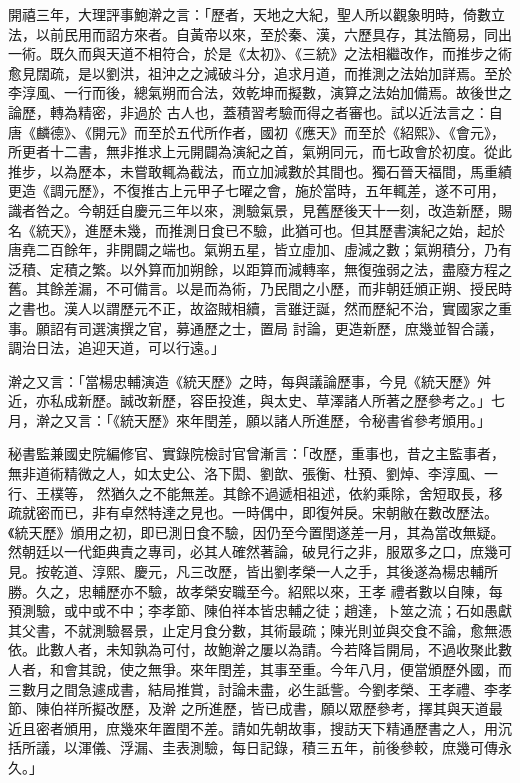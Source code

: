 \begin{pinyinscope}
 開禧三年，大理評事鮑澣之言：「歷者，天地之大紀，聖人所以觀象明時，倚數立法，以前民用而詔方來者。自黃帝以來，至於秦、漢，六歷具存，其法簡易，同出一術。既久而與天道不相符合，於是《太初》、《三統》之法相繼改作，而推步之術愈見闊疏，是以劉洪，祖沖之之減破斗分，追求月道，而推測之法始加詳焉。至於李淳風、一行而後，總氣朔而合法，效乾坤而擬數，演算之法始加備焉。故後世之論歷，轉為精密，非過於
 古人也，蓋積習考驗而得之者審也。試以近法言之：自唐《麟德》、《開元》而至於五代所作者，國初《應天》而至於《紹熙》、《會元》，所更者十二書，無非推求上元開闢為演紀之首，氣朔同元，而七政會於初度。從此推步，以為歷本，未嘗敢輒為截法，而立加減數於其間也。獨石晉天福間，馬重績更造《調元歷》，不復推古上元甲子七曜之會，施於當時，五年輒差，遂不可用，識者咎之。今朝廷自慶元三年以來，測驗氣景，見舊歷後天十一刻，改造新歷，賜
 名《統天》，進歷未幾，而推測日食已不驗，此猶可也。但其歷書演紀之始，起於唐堯二百餘年，非開闢之端也。氣朔五星，皆立虛加、虛減之數；氣朔積分，乃有泛積、定積之繁。以外算而加朔餘，以距算而減轉率，無復強弱之法，盡廢方程之舊。其餘差漏，不可備言。以是而為術，乃民間之小歷，而非朝廷頒正朔、授民時之書也。漢人以謂歷元不正，故盜賊相續，言雖迂誕，然而歷紀不治，實國家之重事。願詔有司選演撰之官，募通歷之士，置局
 討論，更造新歷，庶幾並智合議，調治日法，追迎天道，可以行遠。」



 澣之又言：「當楊忠輔演造《統天歷》之時，每與議論歷事，今見《統天歷》舛近，亦私成新歷。誠改新歷，容臣投進，與太史、草澤諸人所著之歷參考之。」七月，澣之又言：「《統天歷》來年閏差，願以諸人所進歷，令秘書省參考頒用。」



 秘書監兼國史院編修官、實錄院檢討官曾漸言：「改歷，重事也，昔之主監事者，無非道術精微之人，如太史公、洛下閎、劉歆、張衡、杜預、劉焯、李淳風、一行、王樸等，
 然猶久之不能無差。其餘不過遞相祖述，依約乘除，舍短取長，移疏就密而已，非有卓然特達之見也。一時偶中，即復舛戾。宋朝敝在數改歷法。《統天歷》頒用之初，即已測日食不驗，因仍至今置閏遂差一月，其為當改無疑。然朝廷以一代鉅典責之專司，必其人確然著論，破見行之非，服眾多之口，庶幾可見。按乾道、淳熙、慶元，凡三改歷，皆出劉孝榮一人之手，其後遂為楊忠輔所勝。久之，忠輔歷亦不驗，故孝榮安職至今。紹熙以來，王孝
 禮者數以自陳，每預測驗，或中或不中；李孝節、陳伯祥本皆忠輔之徒；趙達，卜筮之流；石如愚獻其父書，不就測驗晷景，止定月食分數，其術最疏；陳光則並與交食不論，愈無憑依。此數人者，未知孰為可付，故鮑澣之屢以為請。今若降旨開局，不過收聚此數人者，和會其說，使之無爭。來年閏差，其事至重。今年八月，便當頒歷外國，而三數月之間急遽成書，結局推賞，討論未盡，必生詆訾。今劉孝榮、王孝禮、李孝節、陳伯祥所擬改歷，及澣
 之所進歷，皆已成書，願以眾歷參考，擇其與天道最近且密者頒用，庶幾來年置閏不差。請如先朝故事，搜訪天下精通歷書之人，用沉括所議，以渾儀、浮漏、圭表測驗，每日記錄，積三五年，前後參較，庶幾可傳永久。」




\end{pinyinscope}
